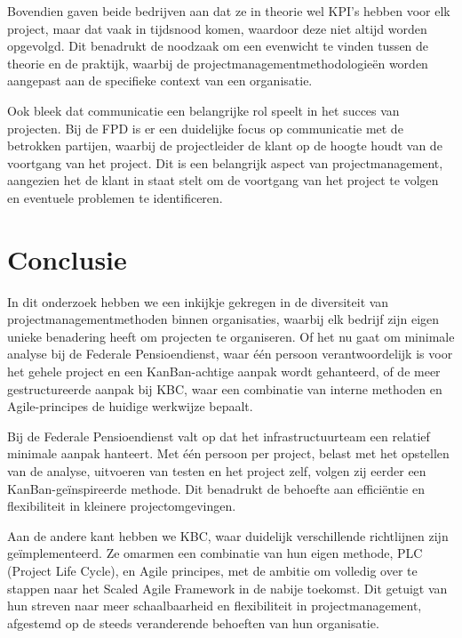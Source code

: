 \documentclass[dutch]{hogent-article}
\begin{document}
Bovendien gaven beide bedrijven aan dat ze in theorie wel KPI's hebben voor elk project, maar dat vaak in tijdsnood komen, waardoor deze niet altijd worden opgevolgd. Dit benadrukt de noodzaak om een evenwicht te vinden tussen de theorie en de praktijk, waarbij de projectmanagementmethodologieën worden aangepast aan de specifieke context van een organisatie.
\newline

Ook bleek dat communicatie een belangrijke rol speelt in het succes van projecten. Bij de FPD is er een duidelijke focus op communicatie met de betrokken partijen, waarbij de projectleider de klant op de hoogte houdt van de voortgang van het project. Dit is een belangrijk aspect van projectmanagement, aangezien het de klant in staat stelt om de voortgang van het project te volgen en eventuele problemen te identificeren.

\section{Conclusie}%
\label{sec:conclusie}

In dit onderzoek hebben we een inkijkje gekregen in de diversiteit van projectmanagementmethoden binnen organisaties, waarbij elk bedrijf zijn eigen unieke benadering heeft om projecten te organiseren. Of het nu gaat om minimale analyse bij de Federale Pensioendienst, waar één persoon verantwoordelijk is voor het gehele project en een KanBan-achtige aanpak wordt gehanteerd, of de meer gestructureerde aanpak bij KBC, waar een combinatie van interne methoden en Agile-principes de huidige werkwijze bepaalt.
\newline

Bij de Federale Pensioendienst valt op dat het infrastructuurteam een relatief minimale aanpak hanteert. Met één persoon per project, belast met het opstellen van de analyse, uitvoeren van testen en het project zelf, volgen zij eerder een KanBan-geïnspireerde methode. Dit benadrukt de behoefte aan efficiëntie en flexibiliteit in kleinere projectomgevingen.
\newline

Aan de andere kant hebben we KBC, waar duidelijk verschillende richtlijnen zijn geïmplementeerd. Ze omarmen een combinatie van hun eigen methode, PLC (Project Life Cycle), en Agile principes, met de ambitie om volledig over te stappen naar het Scaled Agile Framework in de nabije toekomst. Dit getuigt van hun streven naar meer schaalbaarheid en flexibiliteit in projectmanagement, afgestemd op de steeds veranderende behoeften van hun organisatie.
\newline
\end{document}
